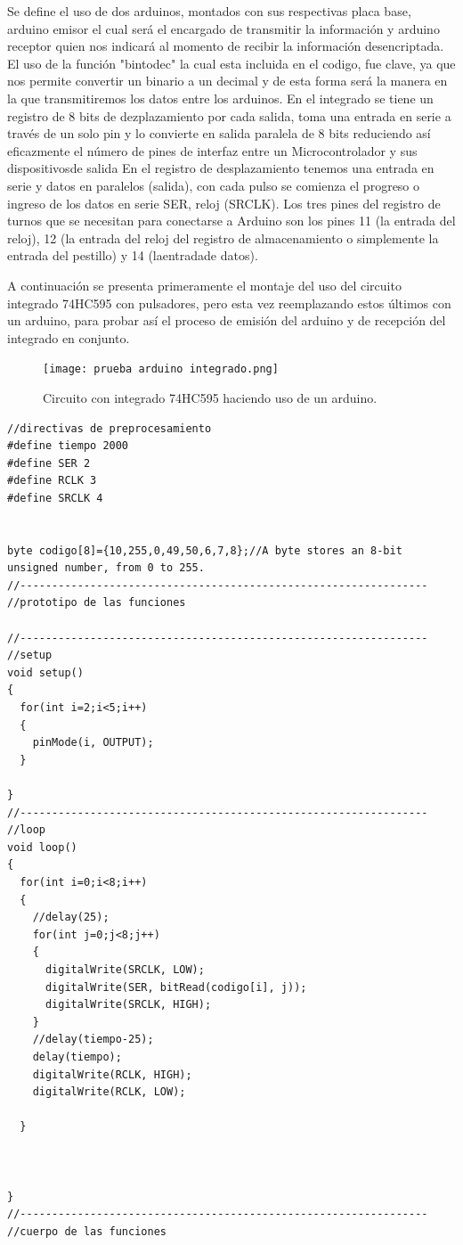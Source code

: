 \documentclass{article}
\begin{document}
\begin{itemize}
Se define el uso de dos arduinos, montados con sus respectivas placa base, arduino emisor el cual será el encargado de transmitir la información y arduino receptor quien nos indicará al momento de recibir la información desencriptada. El uso de la función "bintodec" la cual esta incluida en el codigo, fue clave, ya que nos permite convertir un binario a un decimal y de esta forma será la manera en la que transmitiremos los datos entre los arduinos.\newline
En el integrado se tiene un registro de 8 bits de dezplazamiento por cada salida, toma una entrada en serie a través de un solo pin y lo convierte en salida paralela de 8 bits reduciendo así eficazmente el número de pines de interfaz entre un Microcontrolador y sus dispositivosde salida
En el registro de desplazamiento tenemos una entrada en serie y datos en paralelos (salida), con cada pulso se comienza el progreso o 
ingreso de los datos en serie SER, reloj (SRCLK).\newline
Los tres pines del registro de turnos que se necesitan para conectarse a Arduino son los pines 11 (la entrada del reloj), 12 (la entrada del reloj del registro de almacenamiento o simplemente la entrada del pestillo) y 14 (laentradade datos).


 A continuación se presenta primeramente el montaje del uso del circuito integrado 74HC595 con pulsadores, pero esta vez reemplazando estos últimos con un arduino, para probar así el proceso de emisión del arduino y de recepción del integrado en conjunto.

\begin{figure}[h]
\texttt{[image: prueba arduino integrado.png]}
\centering
\caption{Circuito con integrado 74HC595 haciendo uso de un arduino.}
\label{fig:reemplazo pulsador por arduino}
\end{figure}


\begin{lstlisting}[style=myArduino]
//directivas de preprocesamiento
#define tiempo 2000
#define SER 2
#define RCLK 3
#define SRCLK 4


byte codigo[8]={10,255,0,49,50,6,7,8};//A byte stores an 8-bit unsigned number, from 0 to 255.
//----------------------------------------------------------------
//prototipo de las funciones

//----------------------------------------------------------------
//setup
void setup()
{
  for(int i=2;i<5;i++)
  {
    pinMode(i, OUTPUT);
  }
  
}
//----------------------------------------------------------------
//loop
void loop()
{
  for(int i=0;i<8;i++)
  {
  	//delay(25);
    for(int j=0;j<8;j++)
    {
      digitalWrite(SRCLK, LOW);
      digitalWrite(SER, bitRead(codigo[i], j));
      digitalWrite(SRCLK, HIGH);
    }
    //delay(tiempo-25);
    delay(tiempo);
    digitalWrite(RCLK, HIGH);
    digitalWrite(RCLK, LOW);
    
  }
  
  
  
}
//----------------------------------------------------------------
//cuerpo de las funciones
\end{lstlisting}


\end{itemize}
\end{document}
